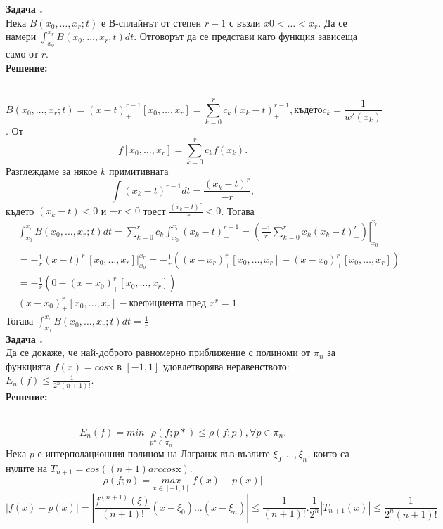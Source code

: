 \documentclass[12pt]{article}
\def\r#1{\mathrm{#1}}
\newcounter{problem}
\newcounter{solution}
\newcommand\problem{%
  \stepcounter{problem}%
  \textbf{Задача \theproblem.}~%
  \\
}
\newcommand\solution{%
  \textbf{Решение:}\\~%
}
\begin{document}
\problem
Нека $B(x_0,\ldots,x_r;t)$  е  В-сплайнът от степен $r-1$ с възли $x0<\ldots<x_r.$ Да се намери $\int_{x_0}^{x_r}B(x_0,\ldots,x_r,t)dt$. Отговорът да се представи като функция зависеща само от $r$.
\\
\solution
\begin{equation*}
B(x_0,\ldots,x_r;t)=(x-t)^{r-1}_+[x_0,\ldots,x_r]=\sum_{k=0}^{r}c_k(x_k-t)^{r-1}_+, \text{където} c_k = \frac{1}{w'(x_k)}
\end{equation*}.
От
\begin{equation*}
f[x_0,\ldots,x_r] = \sum_{k=0}^{r}c_kf(x_k).
\end{equation*}
Разглеждаме за някое $k$ примитивната
\begin{equation*}
\int (x_k-t)^{r-1}dt = \frac{(x_k-t)^r}{-r},
\end{equation*}
където $(x_k-t)<0$ и $-r<0$ тоест $\frac{(x_k-t)^r}{-r}<0$. Тогава
\begin{align*}
&\int_{x_0}^{x_r}B(x_0,\ldots,x_r;t)dt = 
\sum_{k=0}^{r}c_k\int_{x_0}^{x_r}(x_k-t)^{r-1}_+
=\left.\left(\frac{-1}{r}\sum_{k=0}^{r}x_k(x_k-t)^r_+\right)\right\rvert_{x_0}^{x_r} \\
&= -\frac{1}{r}(x-t)^r_+[x_0,\ldots,x_r]\rvert_{x_0}^{x_r} 
= -\frac{1}{r}((x-x_r)^r_+[x_0,\ldots,x_r] - (x-x_0)^r_+[x_0,\ldots,x_r]) \\
&= -\frac{1}{r}(0 - (x-x_0)^r_+[x_0,\ldots,x_r]) \\
&(x-x_0)^r_+[x_0,\ldots,x_r] - \text{коефициента пред } x^r = 1.
\end{align*}
Тогава $\boxed{\int_{x_0}^{x_r}B(x_0,\ldots,x_r;t)dt = \frac{1}{r}}$\\
\problem
Да се докаже, че най-доброто равномерно приближение с полиноми от $\pi_n$ за функцията $f(x) = cos\r x$ в $[-1,1]$ удовлетворява неравенството: $E_n(f) \leq \frac{1}{2^n(n+1)!}$.\\
\solution
\begin{equation*}
E_n(f) = \underset{p*\in\pi_n}{min\text{ }\rho(f;p*)}\leq \rho(f;p),\forall p\in\pi_n.
\end{equation*}
Нека $p$ е интерполационния полином на Лагранж във възлите $\xi_0,\ldots,\xi_n$, които са нулите на $T_{n+1} = cos\left((n+1) arccos \r x\right)$.
\begin{equation*}
\rho(f;p)=\underset{x\in [-1,1]}{max}|f(x)-p(x)|
\end{equation*}
\begin{equation*}
|f(x)-p(x)| = \left |\frac{f^{(n+1)}(\xi)}{(n+1)!}(x-\xi_0)\ldots(x-\xi_n)\right| \leq \frac{1}{(n+1)!}.\frac{1}{2^n}|T_{n+1}(x)|\leq\frac{1}{2^n (n+1)!}
\end{equation*}
\end{document}

